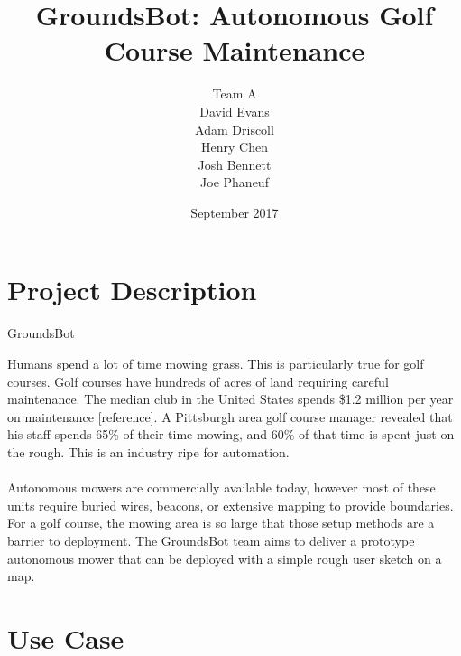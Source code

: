 \documentclass{article}
\begin{document}


\title{GroundsBot: Autonomous Golf Course Maintenance}
\date{September 2017}
\author{Team A        \\ David Evans \\
        Adam Driscoll \\ Henry Chen  \\
        Josh Bennett  \\ Joe Phaneuf \\ }

\maketitle
\def\svgwidth{\columnwidth}

\newpage

\tableofcontents
\newpage

\section{Project Description}

\begin{center}
GroundsBot \\
\end{center}

Humans spend a lot of time mowing grass. This is particularly true for golf courses. Golf courses have hundreds of acres of land requiring careful maintenance.  The median club in the United States spends \$1.2 million per year on maintenance [reference]. A Pittsburgh area golf course manager revealed that his staff spends 65\% of their time mowing, and 60\% of that time is spent just on the rough. This is an industry ripe for automation.
\\
\\
Autonomous mowers are commercially available today, however most of these units require buried wires, beacons, or extensive mapping to provide boundaries. For a golf course, the mowing area is so large that those setup methods are a barrier to deployment. The GroundsBot team aims to deliver a prototype autonomous mower that can be deployed with a simple rough user sketch on a map.

\section{Use Case}
\end{document}
